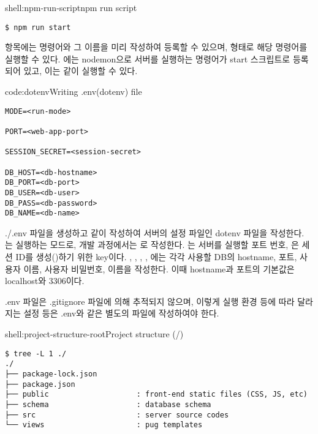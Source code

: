 \begin{shell}{shell:npm-run-script}{npm run script}
\begin{verbatim}
$ npm run start
\end{verbatim}
\end{shell}

 항목에는 명령어와 그 이름을 미리 작성하여 등록할 수 있으며,  형태로 해당 명령어를 실행할 수 있다. 에는 nodemon으로 서버를 실행하는 명령어가 start 스크립트로 등록되어 있고, 이는 \와 같이 실행할 수 있다.

\begin{code}{code:dotenv}{Writing .env(dotenv) file}
\begin{verbatim}
MODE=<run-mode>

PORT=<web-app-port>

SESSION_SECRET=<session-secret>

DB_HOST=<db-hostname>
DB_PORT=<db-port>
DB_USER=<db-user>
DB_PASS=<db-password>
DB_NAME=<db-name>
\end{verbatim}
\end{code}

./.env 파일을 생성하고 \와 같이 작성하여 서버의 설정 파일인 dotenv 파일을 작성한다. 는 실행하는 모드로, 개발 과정에서는 로 작성한다. 는 서버를 실행할 포트 번호, 은 세션 ID를 생성()하기 위한 key이다. , , , , 에는 각각 사용할 DB의 hostname, 포트, 사용자 이름, 사용자 비밀번호, 이름을 작성한다. 이때 hostname과 포트의 기본값은 localhost와 3306이다.

.env 파일은 .gitignore 파일에 의해 추적되지 않으며, 이렇게 실행 환경 등에 따라 달라지는 설정 등은 .env와 같은 별도의 파일에 작성하여야 한다.

\begin{shell}{shell:project-structure-root}{Project structure (/)}
\begin{verbatim}
$ tree -L 1 ./
./
├── package-lock.json
├── package.json
├── public                    : front-end static files (CSS, JS, etc)
├── schema                    : database schema
├── src                       : server source codes
└── views                     : pug templates
\end{verbatim}
\end{shell}

